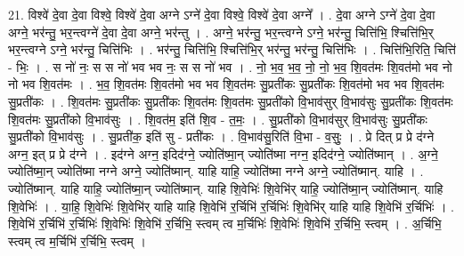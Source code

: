 \documentclass[17pt]{extarticle}
\begin{document}
21. विश्वे॑ दे॒वा दे॒वा विश्वे॒ विश्वे॑ दे॒वा अग्ने ऽग्ने॑ दे॒वा विश्वे॒ विश्वे॑ दे॒वा अग्ने᳚ । . दे॒वा अग्ने ऽग्ने॑ दे॒वा दे॒वा अग्ने॒ भर॑न्तु॒ भर॒न्त्वग्ने॑ दे॒वा दे॒वा अग्ने॒ भर॑न्तु । . अग्ने॒ भर॑न्तु॒ भर॒न्त्वग्ने ऽग्ने॒ भर॑न्तु॒ चित्ति॑भि॒ श्चित्ति॑भि॒र् भर॒न्त्वग्ने ऽग्ने॒ भर॑न्तु॒ चित्ति॑भिः । . भर॑न्तु॒ चित्ति॑भि॒ श्चित्ति॑भि॒र् भर॑न्तु॒ भर॑न्तु॒ चित्ति॑भिः । . चित्ति॑भि॒रिति॒ चित्ति॑ - भिः॒ । . स नो॑ नः॒ स स नो॑ भव भव नः॒ स स नो॑ भव । . नो॒ भ॒व॒ भ॒व॒ नो॒ नो॒ भ॒व॒ शि॒वत॑मः शि॒वत॑मो भव नो नो भव शि॒वत॑मः । . भ॒व॒ शि॒वत॑मः शि॒वत॑मो भव भव शि॒वत॑मः सु॒प्रती॑कः सु॒प्रती॑कः शि॒वत॑मो भव भव शि॒वत॑मः सु॒प्रती॑कः । . शि॒वत॑मः सु॒प्रती॑कः सु॒प्रती॑कः शि॒वत॑मः शि॒वत॑मः सु॒प्रती॑को वि॒भाव॑सुर् वि॒भाव॑सुः सु॒प्रती॑कः शि॒वत॑मः शि॒वत॑मः सु॒प्रती॑को वि॒भाव॑सुः । . शि॒वत॑म॒ इति॑ शि॒व - त॒मः॒ । . सु॒प्रती॑को वि॒भाव॑सुर् वि॒भाव॑सुः सु॒प्रती॑कः सु॒प्रती॑को वि॒भाव॑सुः । . सु॒प्रती॑क॒ इति॑ सु - प्रती॑कः । . वि॒भाव॑सु॒रिति॑ वि॒भा - व॒सुः॒ । . प्रे दित् प्र प्रे द॑ग्ने अग्न॒ इत् प्र प्रे द॑ग्ने । . इद॑ग्ने अग्न॒ इदिद॑ग्ने॒ ज्योति॑ष्मा॒न् ज्योति॑ष्मा नग्न॒ इदिद॑ग्ने॒ ज्योति॑ष्मान् । . अ॒ग्ने॒ ज्योति॑ष्मा॒न् ज्योति॑ष्मा नग्ने अग्ने॒ ज्योति॑ष्मान्. याहि याहि॒ ज्योति॑ष्मा नग्ने अग्ने॒ ज्योति॑ष्मान्. याहि । . ज्योति॑ष्मान्. याहि याहि॒ ज्योति॑ष्मा॒न् ज्योति॑ष्मान्. याहि शि॒वेभिः॑ शि॒वेभि॑र् याहि॒ ज्योति॑ष्मा॒न् ज्योति॑ष्मान्. याहि शि॒वेभिः॑ । . या॒हि॒ शि॒वेभिः॑ शि॒वेभि॑र् याहि याहि शि॒वेभि॑ र॒र्चिभि॑ र॒र्चिभिः॑ शि॒वेभि॑र् याहि याहि शि॒वेभि॑ र॒र्चिभिः॑ । . शि॒वेभि॑ र॒र्चिभि॑ र॒र्चिभिः॑ शि॒वेभिः॑ शि॒वेभि॑ र॒र्चिभि॒ स्त्वम् त्व म॒र्चिभिः॑ शि॒वेभिः॑ शि॒वेभि॑ र॒र्चिभि॒ स्त्वम् । . अ॒र्चिभि॒ स्त्वम् त्व म॒र्चिभि॑ र॒र्चिभि॒ स्त्वम् । \newline
\end{document}
